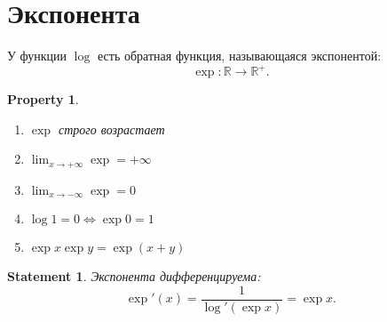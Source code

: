 \documentclass[11pt]{book}
\newcommand{\R}{\mathbb{R}}
\theoremstyle{definition}
\theoremstyle{plain}
\theoremstyle{plain}
\newtheorem*{st}{Statement}
\newtheorem*{prop}{Property}
\theoremstyle{definition}
\theoremstyle{remark}
\begin{document}
\section{Экспонента}
\begin{defn}
    У функции $  \log $ есть обратная функция, называющаяся экспонентой:
    \[
	\exp: \R \to  \R^{+}
    .\]
\end{defn}
\begin{prop}
    $ $
    \begin{enumerate}
	\item
	    $ \exp$ строго возрастает
	\item
	    $
		\lim_{x \to +\infty}  \exp = +\infty
		$
	\item
	    $
		\lim_{x \to -\infty}   \exp = 0
		$
	\item
	    $
		\log 1 = 0 \Leftrightarrow \exp 0 = 1
		$
	\item
	    $
		\exp x \exp y = \exp(x+y)
		$
    \end{enumerate}
\end{prop}
\begin{st}
    Экспонента дифференцируема:
    \[
	\exp' (x) = \frac{1}{\log'(\exp x)} = \exp x
    .\]
\end{st}
\end{document}
